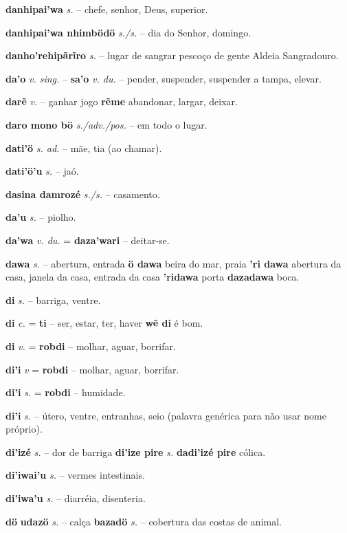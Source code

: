 \textbf{danhipai'wa} \textit{s.} -- chefe, senhor, Deus, superior.

\textbf{danhipai'wa nhimbödö} \textit{s./s.} -- dia do Senhor, domingo.

\textbf{danho'rehipãrĩro} \textit{s.} -- lugar de sangrar pescoço de gente  Aldeia Sangradouro.

\textbf{da'o} \textit{v. sing.} -- \textbf{sa'o} \textit{v. du.} -- pender, suspender, suspender a tampa, elevar.

\textbf{darẽ} \textit{v.} -- ganhar jogo  \textbf{rẽme} abandonar, largar, deixar.

\textbf{daro mono bö} \textit{s./adv./pos.} -- em todo o lugar.

\textbf{dati'ö} \textit{s. ad.} -- mãe, tia (ao chamar).

\textbf{dati'ö'u} \textit{s.} -- jaó.

\textbf{dasina damrozé} \textit{s./s.} -- casamento.

\textbf{da'u} \textit{s.} -- piolho.

\textbf{da'wa} \textit{v. du.} = \textbf{daza'wari} -- deitar-se.

\textbf{dawa} \textit{s.} -- abertura, entrada  \textbf{ö dawa} beira do mar, praia  \textbf{'ri dawa} abertura da casa, janela da casa, entrada da casa  \textbf{'ridawa} porta  \textbf{dazadawa} boca.

\textbf{di} \textit{s.} -- barriga, ventre.

\textbf{di} \textit{c.} = \textbf{ti} -- ser, estar, ter, haver  \textbf{wẽ di} é bom.

\textbf{di} \textit{v.} = \textbf{robdi} -- molhar, aguar, borrifar.

\textbf{di'i} \textit{v} = \textbf{robdi} -- molhar, aguar, borrifar.

\textbf{di'i} \textit{s.} = \textbf{robdi} -- humidade.

\textbf{di'i} \textit{s.} -- útero, ventre, entranhas, seio (palavra genérica para não usar nome próprio).

\textbf{di'izé} \textit{s.} -- dor de barriga  \textbf{di'ize pire} \textit{s.} \textbf{dadi'izé pire} cólica.

\textbf{di'iwai'u} \textit{s.} -- vermes intestinais.

\textbf{di'iwa'u} \textit{s.} -- diarréia, disenteria.

\textbf{dö}  \textbf{udazö} \textit{s.} -- calça  \textbf{bazadö} \textit{s.} -- cobertura das costas de animal.

